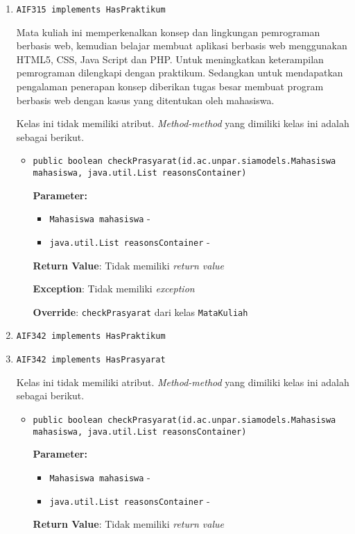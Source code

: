 \documentclass{article}
\begin{document}
\begin{enumerate}
\item \texttt{AIF315 implements HasPraktikum}

Mata kuliah ini memperkenalkan konsep dan lingkungan pemrograman berbasis web,
 kemudian belajar membuat aplikasi berbasis web menggunakan HTML5, CSS, Java Script 
 dan PHP. Untuk meningkatkan keterampilan pemrograman dilengkapi dengan praktikum. 
 Sedangkan untuk mendapatkan pengalaman penerapan konsep diberikan tugas besar membuat 
 program berbasis web dengan kasus yang ditentukan oleh mahasiswa.

Kelas ini tidak memiliki atribut. \textit{Method-method} yang dimiliki kelas ini adalah sebagai berikut.
\begin{itemize}
\item \texttt{public boolean checkPrasyarat(id.ac.unpar.siamodels.Mahasiswa mahasiswa, java.util.List reasonsContainer)}

\textbf{Parameter:}
\begin{itemize}
\item \texttt{Mahasiswa mahasiswa} - 
\item \texttt{java.util.List reasonsContainer} - 
\end{itemize}
\textbf{Return Value}: Tidak memiliki \textit{return value}

\textbf{Exception}: Tidak memiliki \textit{exception}

\textbf{Override}: \texttt{checkPrasyarat} dari kelas \texttt{MataKuliah}

\end{itemize}
\item \texttt{AIF342 implements HasPraktikum}

\item \texttt{AIF342 implements HasPrasyarat}



Kelas ini tidak memiliki atribut. \textit{Method-method} yang dimiliki kelas ini adalah sebagai berikut.
\begin{itemize}
\item \texttt{public boolean checkPrasyarat(id.ac.unpar.siamodels.Mahasiswa mahasiswa, java.util.List reasonsContainer)}

\textbf{Parameter:}
\begin{itemize}
\item \texttt{Mahasiswa mahasiswa} - 
\item \texttt{java.util.List reasonsContainer} - 
\end{itemize}
\textbf{Return Value}: Tidak memiliki \textit{return value}


\end{itemize}
\end{enumerate}
\end{document}
